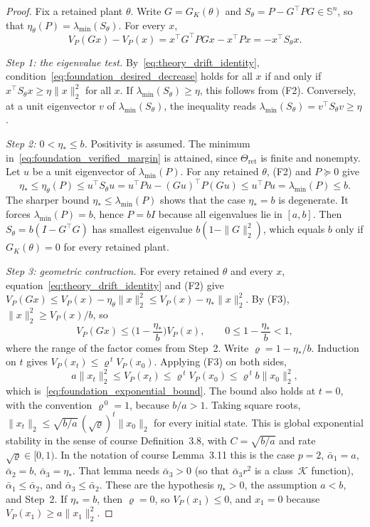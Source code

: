 \begin{proof}
Fix a retained plant $\theta$. Write $G=G_K(\theta)$ and
$S_\theta=P-G^\top PG\in\mathbb S^n$, so that
$\eta_\theta(P)=\lambda_{\min}(S_\theta)$. For every $x$,
\begin{equation}
\label{eq:theory_drift_identity}
 V_P(Gx)-V_P(x)=x^\top G^\top PGx-x^\top Px=-x^\top S_\theta x .
\end{equation}

\emph{Step 1: the eigenvalue test.} By~\eqref{eq:theory_drift_identity},
condition~\eqref{eq:foundation_desired_decrease} holds for all $x$ if and
only if $x^\top S_\theta x\ge\eta\|x\|_2^2$ for all $x$. If
$\lambda_{\min}(S_\theta)\ge\eta$, this follows from (F2). Conversely, at a
unit eigenvector $v$ of $\lambda_{\min}(S_\theta)$, the inequality reads
$\lambda_{\min}(S_\theta)=v^\top S_\theta v\ge\eta$.

\emph{Step 2: $0<\eta_*\le b$.} Positivity is assumed. The minimum
in~\eqref{eq:foundation_verified_margin} is attained, since
$\Theta_{\mathrm{ret}}$ is finite and nonempty. Let $u$ be a unit
eigenvector of $\lambda_{\min}(P)$. For any retained $\theta$, (F2) and
$P\succeq0$ give
\[
 \eta_*\le\eta_\theta(P)\le u^\top S_\theta u
 =u^\top Pu-(Gu)^\top P(Gu)\le u^\top Pu=\lambda_{\min}(P)\le b .
\]
The sharper bound $\eta_*\le\lambda_{\min}(P)$ shows that the case
$\eta_*=b$ is degenerate. It forces $\lambda_{\min}(P)=b$, hence $P=bI$
because all eigenvalues lie in $[a,b]$. Then
$S_\theta=b(I-G^\top G)$ has smallest eigenvalue $b(1-\|G\|_2^2)$, which
equals $b$ only if $G_K(\theta)=0$ for every retained plant.

\emph{Step 3: geometric contraction.} For every retained $\theta$ and every
$x$, equation~\eqref{eq:theory_drift_identity} and (F2) give
$V_P(Gx)\le V_P(x)-\eta_\theta\|x\|_2^2\le V_P(x)-\eta_*\|x\|_2^2$. By (F3),
$\|x\|_2^2\ge V_P(x)/b$, so
\[
 V_P(Gx)\le\Big(1-\frac{\eta_*}{b}\Big)V_P(x),
 \qquad 0\le1-\frac{\eta_*}{b}<1,
\]
where the range of the factor comes from Step~2. Write
$\varrho=1-\eta_*/b$. Induction on $t$ gives
$V_P(x_t)\le\varrho^{\,t}V_P(x_0)$. Applying (F3) on both sides,
\[
 a\|x_t\|_2^2\le V_P(x_t)\le\varrho^{\,t}V_P(x_0)\le\varrho^{\,t}b\|x_0\|_2^2,
\]
which is~\eqref{eq:foundation_exponential_bound}. The bound also holds at
$t=0$, with the convention $\varrho^{\,0}=1$, because $b/a>1$. Taking
square roots,
$\|x_t\|_2\le\sqrt{b/a}\,(\sqrt\varrho)^{t}\|x_0\|_2$ for every initial
state. This is global exponential stability in the sense of course
Definition~3.8, with $C=\sqrt{b/a}$ and rate $\sqrt\varrho\in[0,1)$. In the
notation of course Lemma~3.11 this is the case $p=2$,
$\bar\alpha_1=a$, $\bar\alpha_2=b$, $\bar\alpha_3=\eta_*$. That lemma
needs $\bar\alpha_3>0$ (so that $\bar\alpha_3r^2$ is a class~$\mathcal K$
function), $\bar\alpha_1\le\bar\alpha_2$, and $\bar\alpha_3\le\bar\alpha_2$.
These are the hypothesis $\eta_*>0$, the assumption $a<b$, and Step~2. If $\eta_*=b$, then $\varrho=0$, so
$V_P(x_1)\le0$, and $x_1=0$ because $V_P(x_1)\ge a\|x_1\|_2^2$.


\end{proof}
